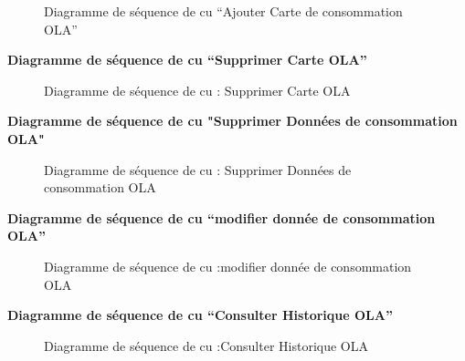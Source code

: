 \documentclass[a4paper,11pt]{report}
\begin{document}
\begin{figure}[H]
  \centering
  \setlength{\fboxrule}{1pt}
  \setlength{\fboxsep}{3pt}
  \caption{Diagramme de séquence de cu “Ajouter Carte de consommation OLA”
 }
  \label{fig:clone-result}
\end{figure}

\newpage
\textbf{Diagramme de séquence de cu “Supprimer Carte OLA”
 }

\begin{figure}[H]
  \centering
  \setlength{\fboxrule}{1pt}
  \setlength{\fboxsep}{3pt}
  \caption{ Diagramme de séquence de cu : Supprimer Carte OLA
 }
  \label{fig:clone-result}
\end{figure}




\newpage
\textbf{ Diagramme de séquence de cu "Supprimer  Données de consommation OLA"
 }

\begin{figure}[H]
  \centering
  \setlength{\fboxrule}{1pt}
  \setlength{\fboxsep}{3pt}
  \caption{ Diagramme de séquence de cu : Supprimer  Données de consommation OLA
 }
  \label{fig:clone-result}
\end{figure}


\newpage
\textbf{ Diagramme de séquence de cu “modifier donnée de consommation OLA”}

\begin{figure}[H]
  \centering
  \setlength{\fboxrule}{1pt}
  \setlength{\fboxsep}{3pt}
  \caption{ Diagramme de séquence de cu :modifier donnée de consommation OLA
 }
  \label{fig:clone-result}
\end{figure}




\newpage
\textbf{ Diagramme de séquence de cu “Consulter Historique OLA”}

\begin{figure}[H]
  \centering
  \setlength{\fboxrule}{1pt}
  \setlength{\fboxsep}{3pt}
  \caption{ Diagramme de séquence de cu :Consulter Historique OLA
 }
  \label{fig:clone-result}
\end{figure}
\end{document}
